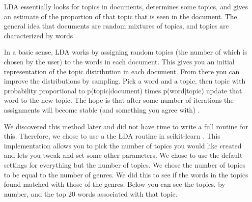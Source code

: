 \documentclass[11pt]{article}
\begin{document}
LDA essentially looks for topics in documents, determines some topics, and gives an estimate of the proportion of that topic that is seen in the document. The general idea that documents are random mixtures of topics, and topics are characterized by words \cite{blei2003}. 

In a basic sense, LDA works by assigning random topics (the number of which is chosen by the user) to the words in each document. This gives you an initial representation of the topic distribution in each document. From there you can improve the distributions by sampling. Pick a word and a topic, then topic with probability proportional to p(topic$|$document) times p(word$|$topic) update that word to the new topic. The hope is that after some number of iterations the assignments will become stable (and something you agree with) \cite{kdnuggets:topic_model, chen2011, blei2003}. 

We discovered this method later and did not have time to write a full routine for this. Therefore, we chose to use a the LDA routine in scikit-learn \cite{scikit-learn}. This implementation allows you to pick the number of topics you would like created and lets you tweak and set some other parameters. We chose to use the default settings for everything but the number of topics. We chose the number of topics to be equal to the number of genres. We did this to see if the words in the topics found matched with those of the genres. Below you can see the topics, by number, and the top 20 words associated with that topic.
\end{document}

